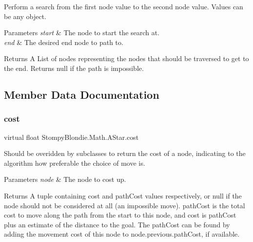 Perform a search from the first node value to the second node value. Values can be any object.


\begin{DoxyParams}{Parameters}
{\em start} & The node to start the search at. \\
\hline
{\em end} & The desired end node to path to. \\
\hline
\end{DoxyParams}
\begin{DoxyReturn}{Returns}
A List of nodes representing the nodes that should be traversed to get to the end. Returns null if the path is impossible. 
\end{DoxyReturn}


\subsection{Member Data Documentation}
\mbox{\label{class_stompy_blondie_1_1_math_1_1_a_star_a2e63d84e2680f0047a2beb68b4e19d6e}} 
\subsubsection{\texorpdfstring{cost}{cost}}
{\footnotesize\ttfamily virtual float Stompy\+Blondie.\+Math.\+A\+Star.\+cost}

Should be overidden by subclasses to return the cost of a node, indicating to the algorithm how preferable the choice of move is.


\begin{DoxyParams}{Parameters}
{\em node} & The node to cost up. \\
\hline
\end{DoxyParams}
\begin{DoxyReturn}{Returns}
A tuple containing cost and path\+Cost values respectively, or null if the node should not be considered at all (an impossible move). path\+Cost is the total cost to move along the path from the start to this node, and cost is path\+Cost plus an estimate of the distance to the goal. The path\+Cost can be found by adding the movement cost of this node to node.\+previous.\+path\+Cost, if available. 
\end{DoxyReturn}
\mbox{\label{class_stompy_blondie_1_1_math_1_1_a_star_ab1472040ee08ddfc6f2817198de0ea97}} 
